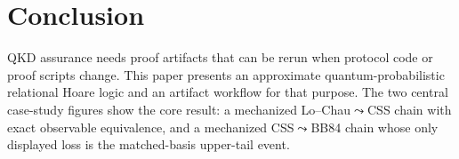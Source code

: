 \section{Conclusion}

QKD assurance needs proof artifacts that can be rerun when protocol code or proof scripts change. This paper presents an approximate quantum-probabilistic relational Hoare logic and an artifact workflow for that purpose. The two central case-study figures show the core result: a mechanized Lo--Chau$\leadsto$CSS chain with exact observable equivalence, and a mechanized CSS$\leadsto$BB84 chain whose only displayed loss is the matched-basis upper-tail event.
